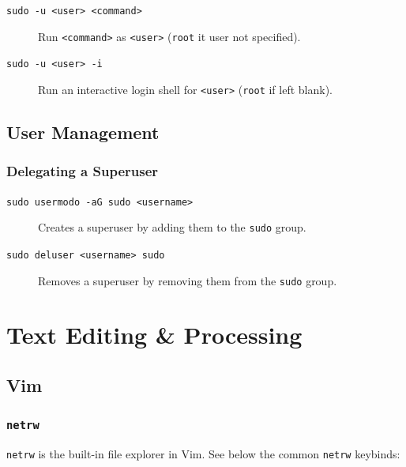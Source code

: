 \documentclass{article}
\newcommand{\code}[1]{\texttt{#1}}
\begin{document}
\begin{description}
    \item[\code{sudo -u <user> <command>}] Run \code{<command>} as \code{<user>} (\code{root} it user not specified).
    \item[\code{sudo -u <user> -i}] Run an interactive login shell for \code{<user>} (\code{root} if left blank).
\end{description}

\subsection{User Management}

\subsubsection{Delegating a Superuser}

\begin{description}
    \item[\code{sudo usermodo -aG sudo <username>}] Creates a superuser by adding them to the \code{sudo} group.
    \item[\code{sudo deluser <username> sudo}] Removes a superuser by removing them from the \code{sudo} group.
\end{description}

\section{Text Editing \& Processing}

\subsection{Vim}

\subsubsection{\code{netrw}}

\code{netrw} is the built-in file explorer in Vim. See below the common \code{netrw} keybinds:
\end{document}
